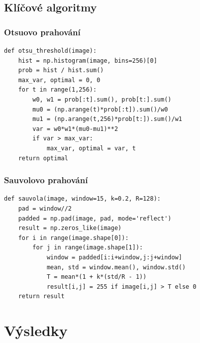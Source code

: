\documentclass[12pt,a4paper]{article}
\begin{document}
\subsection{Klíčové algoritmy}

\subsubsection{Otsuovo prahování}
\begin{verbatim}
def otsu_threshold(image):
    hist = np.histogram(image, bins=256)[0]
    prob = hist / hist.sum()
    max_var, optimal = 0, 0
    for t in range(1,256):
        w0, w1 = prob[:t].sum(), prob[t:].sum()
        mu0 = (np.arange(t)*prob[:t]).sum()/w0
        mu1 = (np.arange(t,256)*prob[t:]).sum()/w1
        var = w0*w1*(mu0-mu1)**2
        if var > max_var:
            max_var, optimal = var, t
    return optimal
\end{verbatim}

\subsubsection{Sauvolovo prahování}
\begin{verbatim}
def sauvola(image, window=15, k=0.2, R=128):
    pad = window//2
    padded = np.pad(image, pad, mode='reflect')
    result = np.zeros_like(image)
    for i in range(image.shape[0]):
        for j in range(image.shape[1]):
            window = padded[i:i+window,j:j+window]
            mean, std = window.mean(), window.std()
            T = mean*(1 + k*(std/R - 1))
            result[i,j] = 255 if image[i,j] > T else 0
    return result
\end{verbatim}

\section{Výsledky}
\end{document}
